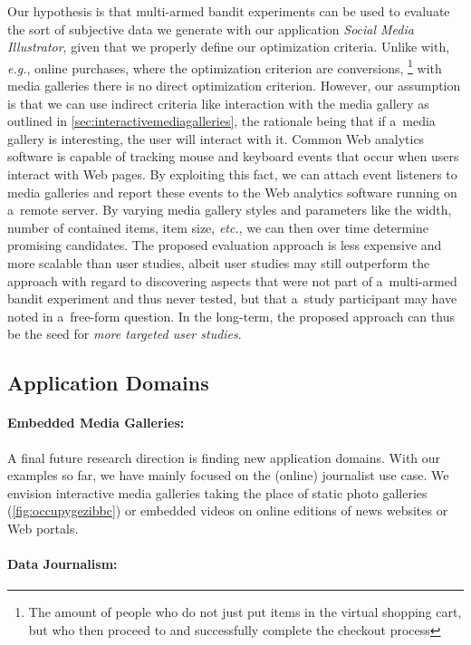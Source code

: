 Our hypothesis is that multi-armed bandit experiments can be used
to evaluate the sort of subjective data we generate
with our application \emph{Social Media Illustrator}, given that we
properly define our optimization criteria.
Unlike with, \emph{e.g.}, online purchases,
where the optimization criterion are conversions,%
\footnote{The amount of people who do not just put items in the virtual shopping cart,
but who then proceed to and successfully complete the checkout process}
with media galleries there is no direct optimization criterion.
However, our assumption is that we can use indirect criteria like
interaction with the media gallery
as outlined in \autoref{sec:interactivemediagalleries},
the rationale being that if
a~media gallery is interesting, the user will interact with it.
Common Web analytics software is capable of tracking mouse and
keyboard events that occur when users interact with Web pages.
By exploiting this fact, we can attach event listeners
to media galleries and report these events
to the Web analytics software running on a~remote server.
By varying media gallery styles and parameters like the width,
number of contained items, item size, \emph{etc.},
we can then over time determine promising candidates.
The proposed evaluation approach is less expensive
and more scalable than user studies,
albeit user studies may still outperform the approach
with regard to discovering aspects that were not part
of a~multi-armed bandit experiment and thus never tested,
but that a~study participant may have noted in a~free-form question.
In the long-term, the proposed approach
can thus be the seed for \emph{more targeted user studies}.

\subsection{Application Domains}

\paragraph{Embedded Media Galleries:}

A final future research direction is finding new application domains.
With our examples so far, we have mainly focused
on the (online) journalist use case.
We envision interactive media galleries taking the place
of static photo galleries (\autoref{fig:occupygezibbc})
or embedded videos on online editions
of news websites or Web portals.

\paragraph{Data Journalism:}

